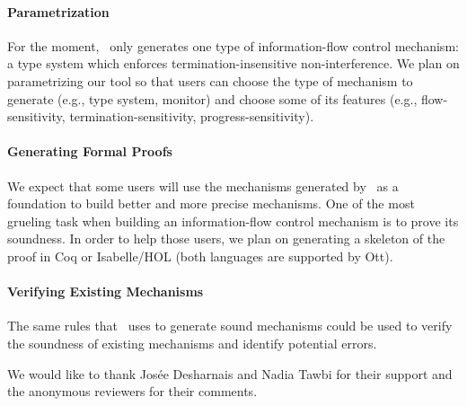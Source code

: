 \documentclass[sigplan,10pt]{acmart}\settopmatter{printfolios=true,printccs=false,printacmref=false}
\begin{document}
\paragraph{Parametrization} For the moment, \ottifc\ only generates one type of information-flow control mechanism: a type system which enforces termination-insensitive non-interference. We plan on parametrizing our tool so that users can choose the type of mechanism to generate (e.g., type system, monitor) and choose some of its features (e.g., flow-sensitivity, termination-sensitivity, progress-sensitivity).

\paragraph{Generating Formal Proofs} We expect that some users will use the mechanisms generated by \ottifc\ as a foundation to build better and more precise mechanisms. One of the most grueling task when building an information-flow control mechanism is to prove its soundness. In order to help those users, we plan on generating a skeleton of the proof in Coq or Isabelle/HOL (both languages are supported by Ott).

\paragraph{Verifying Existing Mechanisms} The same rules that \ottifc\ uses to generate sound mechanisms could be used to verify the soundness of existing mechanisms and identify potential errors.

\begin{acks}
We would like to thank Josée Desharnais and Nadia Tawbi for their support and the anonymous reviewers for their comments.
\end{acks}


\end{document}
